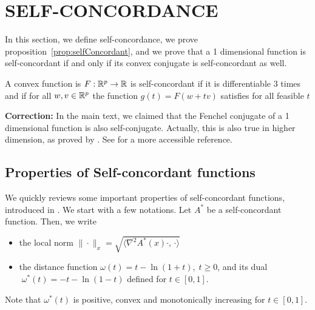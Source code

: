 \documentclass[twoside]{article}
\begin{document}
\section{SELF-CONCORDANCE}
\label{app:self-concordant}

In this section, we define self-concordance, we prove proposition~\ref{prop:selfConcordant}, and we prove that a 1 dimensional function is self-concordant if and only if its convex conjugate is self-concordant as well.

\begin{definition}
\label{def:self-concordance}
A convex function is $F:\mathbb{R}^p \rightarrow \mathbb{R}$ is self-concordant if it is differentiable $3$ times and if for all $w, v \in\mathbb{R}^p$ the function $g(t) = F(w+tv)$ satisfies for all feasible $t$
\end{definition}


{\bf Correction:} In the main text, we claimed that the Fenchel conjugate of a 1 dimensional function is also self-conjugate. 
Actually, this is also true in higher dimension, as proved by \citet{nesterov1994interior}. See \citet[Prop.~6]{sun2019generalized} for a more accessible reference.


\subsection{Properties of Self-concordant functions}

We quickly reviews some important properties of self-concordant functions, introduced in \citep{nesterov2003introductory}. We start with a few notations. Let $A^*$ be a self-concordant function. Then, we write
\begin{itemize}
	\item the local norm $\|\cdot\|_x = \sqrt{ \langle \nabla^2A^*(x)\cdot,\, \cdot \rangle }$ 
	\item the distance function $\omega(t) = t-\ln (1+t),\;t\geq 0$, and its dual $\;\omega^*(t) = -t-\ln(1-t)$ defined for $t\in [0,1]$.
\end{itemize}
Note that $\omega^*(t)$ is positive, convex and monotonically increasing for $t\in[0,1]$.
\end{document}
